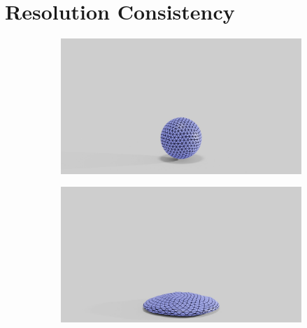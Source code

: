 \section{Resolution Consistency}

\begin{figure}
	\centering
	\begin{subfigure}{.03\linewidth}
	\end{subfigure}%
	\begin{subfigure}{.16\linewidth}
		\centering
		{\includegraphics[width=2.0\textwidth]{images/coarse_ball/045/0200.jpg}}
		\label{sfig:ball-045-1}
	\end{subfigure}%
	\begin{subfigure}{.16\linewidth}
		\centering
		{\includegraphics[width=2.0\textwidth]{images/coarse_ball/045/0250.jpg}}
		\label{sfig:ball-045-2}
	\end{subfigure}%

\end{figure}
